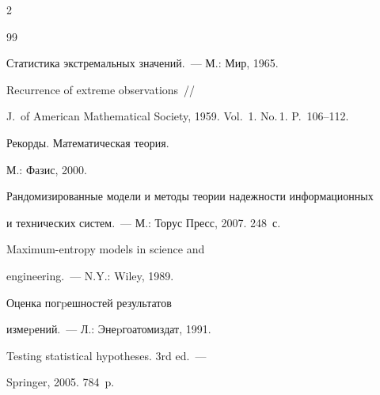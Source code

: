 \begin{multicols}{2}
{{\begin{thebibliography}{99}




Статистика экстремальных значений.~--- М.: Мир, 1965.









Recurrence of extreme observations~//


J.\ of American Mathematical Society, 1959. Vol.~1. No.\,1. P.~106--112.









Рекорды. Математическая теория.


М.: Фазис, 2000.









Рандомизированные модели и методы теории надежности информационных


и технических систем.~--- М.: Торус Пресс, 2007. 248~с.









Maximum-entropy models in science and


engineering.~--- N.Y.: Wiley, 1989.









Оценка погpешностей результатов


измеpений.~---  Л.: Энеpгоатомиздат, 1991.









Testing statistical hypotheses. 3rd ed.~---


Springer, 2005. 784~p.






\end{thebibliography}}}
\end{multicols}
